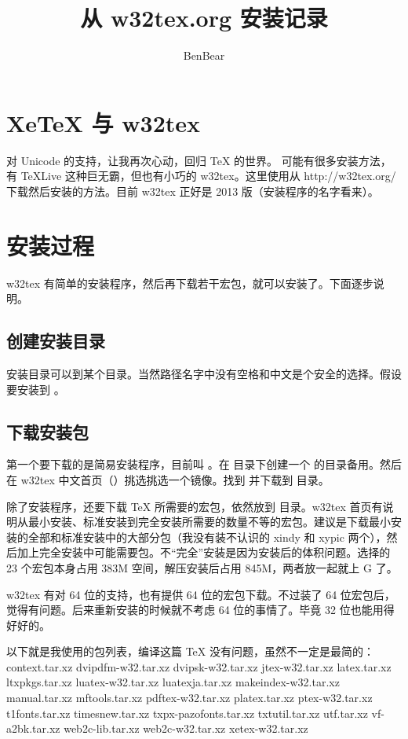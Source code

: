 \documentclass{article}
\title{\XeTeX 从 w32tex.org 安装记录}
\author{BenBear}
\begin{document}
\maketitle

\section{XeTeX 与 w32tex}

{\XeTeX} 对 Unicode 的支持，让我再次心动，回归 {\TeX} 的世界。{\XeTeX} 可能有很多安装方法，有 TeXLive 这种巨无霸，但也有小巧的 w32tex。这里使用从 http://w32tex.org/ 下载然后安装的方法。目前 w32tex 正好是 2013 版（安装程序的名字看来）。

\section{安装过程}
w32tex 有简单的安装程序，然后再下载若干宏包，就可以安装了。下面逐步说明。

\subsection{创建安装目录}
安装目录可以到某个目录。当然路径名字中没有空格和中文是个安全的选择。假设要安装到 。

\subsection{下载安装包}
第一个要下载的是简易安装程序，目前叫 。在  目录下创建一个  的目录备用。然后在 w32tex 中文首页（）挑选挑选一个镜像。找到  并下载到  目录。

除了安装程序，还要下载 {\TeX} 所需要的宏包，依然放到  目录。w32tex 首页有说明从最小安装、标准安装到完全安装所需要的数量不等的宏包。建议是下载最小安装的全部和标准安装中的大部分包（我没有装不认识的 xindy 和 xypic 两个），然后加上完全安装中可能需要包。不“完全”安装是因为安装后的体积问题。选择的 23 个宏包本身占用 383M 空间，解压安装后占用 845M，两者放一起就上 G 了。

w32tex 有对 64 位的支持，也有提供 64 位的宏包下载。不过装了 64 位宏包后，觉得有问题。后来重新安装的时候就不考虑 64 位的事情了。毕竟 32 位也能用得好好的。

以下就是我使用的包列表，编译这篇 {\TeX} 没有问题，虽然不一定是最简的：\\context.tar.xz dvipdfm-w32.tar.xz dvipsk-w32.tar.xz jtex-w32.tar.xz latex.tar.xz ltxpkgs.tar.xz luatex-w32.tar.xz luatexja.tar.xz makeindex-w32.tar.xz manual.tar.xz mftools.tar.xz pdftex-w32.tar.xz platex.tar.xz ptex-w32.tar.xz t1fonts.tar.xz timesnew.tar.xz txpx-pazofonts.tar.xz txtutil.tar.xz utf.tar.xz vf-a2bk.tar.xz web2c-lib.tar.xz web2c-w32.tar.xz xetex-w32.tar.xz
\end{document}
